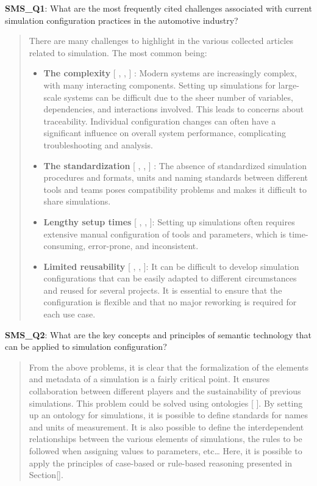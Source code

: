             \textbf{SMS\_Q1}: What are the most frequently cited challenges associated with current simulation configuration practices in the automotive industry?
            \begin{quote}
                There are many challenges to highlight in the various collected articles related to simulation. The most common being:

                \begin{itemize}
                    \item \textbf{The complexity} [ , , ] : Modern systems are increasingly complex, with many interacting components. Setting up simulations for large-scale systems can be difficult due to the sheer number of variables, dependencies, and interactions involved. This leads to concerns about traceability. Individual configuration changes can often have a significant influence on overall system performance, complicating troubleshooting and analysis.
                    \item \textbf{The standardization} [ , , ] : The absence of standardized simulation procedures and formats, units and naming standards between different tools and teams poses compatibility problems and makes it difficult to share simulations.
                    \item \textbf{Lengthy setup times} [ , , ]: Setting up simulations often requires extensive manual configuration of tools and parameters, which is time-consuming, error-prone, and inconsistent.
                    \item \textbf{Limited reusability} [ , , ]: It can be difficult to develop simulation configurations that can be easily adapted to different circumstances and reused for several projects. It is essential to ensure that the configuration is flexible and that no major reworking is required for each use case.\\
                \end{itemize}
            \end{quote}

            \textbf{SMS\_Q2}: What are the key concepts and principles of semantic technology that can be applied to simulation configuration?
            \begin{quote}
                From the above problems, it is clear that the formalization of the elements and metadata of a simulation is a fairly critical point. It ensures collaboration between different players and the sustainability of previous simulations. This problem could be solved using ontologies [ ]. By setting up an ontology for simulations, it is possible to define standards for names and units of measurement. It is also possible to define the interdependent relationships between the various elements of simulations, the rules to be followed when assigning values to parameters, etc… Here, it is possible to apply the principles of case-based or rule-based reasoning presented in Section[].\\
            \end{quote}

